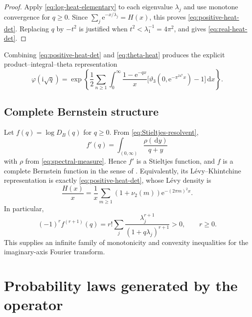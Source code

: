 \documentclass[11pt,oneside]{article}
\theoremstyle{definition}
\newcommand{\dd}{\,\mathrm d}
\newcommand{\e}{\mathrm e}
\newcommand{\ii}{\mathrm i}
\newcommand{\vtwo}{\nu_2}
\newcommand{\phiF}{\varphi}
\begin{document}
\begin{proof}
Apply \eqref{eq:log-heat-elementary} to each eigenvalue \(\lambda_j\) and use monotone
convergence for \(q\ge0\).  Since
\(\sum_j\e^{-x/\lambda_j}=H(x)\), this proves
\eqref{eq:positive-heat-det}.  Replacing \(q\) by \(-t^2\) is justified when
\(t^2<\lambda_1^{-1}=4\pi^2\), and gives \eqref{eq:real-heat-det}.
\end{proof}

Combining \eqref{eq:positive-heat-det} and \eqref{eq:theta-heat} produces the explicit
product--integral--theta representation
\begin{equation}
 \phiF(\ii\sqrt q)=
 \exp\!\left\{
 \frac12\sum_{n\ge1}\int_0^\infty
 \frac{1-\e^{-qx}}x
 \bigl[\vartheta_3(0,\e^{-\pi^24^nx})-1\bigr]\dd x
 \right\}.
 \label{eq:theta-det-combination}
\end{equation}

\subsection{Complete Bernstein structure}
\label{sec:CBF}

Let \(f(q)=\log D_B(q)\) for \(q\ge0\).  From
\eqref{eq:Stieltjes-resolvent},
\begin{equation}
 f'(q)=\int_{(0,\infty)}\frac{\rho(\dd y)}{q+y}
 \label{eq:fprime-Stieltjes}
\end{equation}
with \(\rho\) from \eqref{eq:spectral-measure}.  Hence \(f'\) is a Stieltjes function,
and \(f\) is a complete Bernstein function in the sense of
\cite{SchillingBernstein}.  Equivalently, its L\'evy--Khintchine
representation is exactly \eqref{eq:positive-heat-det}, whose L\'evy density is
\begin{equation}
 \frac{H(x)}x
 =\frac1x\sum_{m\ge1}(1+\vtwo(m))\e^{-(2\pi m)^2x}.
 \label{eq:Levy-density}
\end{equation}
In particular,
\begin{equation}
 (-1)^r f^{(r+1)}(q)
 =r!\sum_j\frac{\lambda_j^{r+1}}{(1+q\lambda_j)^{r+1}}>0,
 \qquad r\ge0.
 \label{eq:Bernstein-signs}
\end{equation}
This supplies an infinite family of monotonicity and convexity inequalities for the
imaginary-axis Fourier transform.

\section{Probability laws generated by the operator}
\label{sec:prob-operator}
\end{document}
